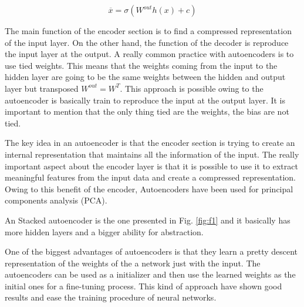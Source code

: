 \documentclass{article}
\begin{document}
\begin{equation}
\overline{x} = \sigma(W^{out}h(x) + c)
\label{eq:2}
\end{equation}

The main function of the encoder section is to find a compressed representation of the input layer. On the other hand, the function of the decoder is reproduce the input layer at the output. A really common practice with autoencoders is to use tied weights. This means that the weights coming from the input to the hidden layer are going to be the same weights between the hidden and output layer but transposed \(W^{out} = W^T\). This approach is possible owing to the autoencoder is basically train to reproduce the input at the output layer. It is important to mention that the only thing tied are the weights, the bias are not tied.

The key idea in an autoencoder is that the encoder section is trying to create an internal representation that maintains all the information of the input. The really important aspect about the encoder layer is that it is possible to use it to extract meaningful features from the input data and create a compressed representation. Owing to this benefit of the encoder, Autoencoders have been used for principal components analysis (PCA).

An Stacked autoencoder is the one presented in Fig. \ref{fig:f1} and it basically has more hidden layers and a bigger ability for abstraction.

One of the biggest advantages of autoencoders is that they learn a pretty descent representation of the weights of the a network just with the input. The autoencoders can be used as a initializer and then use the learned weights as the initial ones for a fine-tuning process. This kind of approach have shown good results and ease the training procedure of neural networks.


\printbibliography
\end{document}
